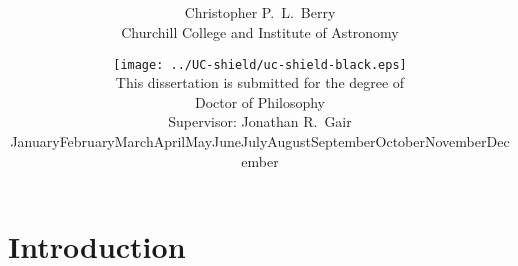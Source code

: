 \documentclass[a4paper, 11pt, titlepage, twoside]{book}
\def\today{\number\day\space\ifcase\month\or January\or February\or March\or April\or May\or June\or July\or August\or September\or October\or November\or December\fi\space\number\year}
\begin{document}
\title{\vspace{0.8cm}
\hrulefill\hspace{0.2cm}\raisebox{-4pt}{\aldineright \aldineleft}\hspace{0.2cm}\hrulefill\\
\\
\vspace{1mm}\hrulefill\hspace{0.2cm}\raisebox{-4pt}{\aldineright \aldineleft}\hspace{0.2cm}\hrulefill}

\author{{\LARGE{}Christopher P.\ L.\ Berry}\vspace{2mm}\\
Churchill College and Institute of Astronomy\\
\vspace{1mm}}

\date{\texttt{[image: ../UC-shield/uc-shield-black.eps]}\vspace{14mm}
\\{This dissertation is submitted for the degree of}\vspace{1mm}\\{\sc\LARGE{}Doctor of Philosophy}\vspace{3mm}
\\{\Large{}Supervisor: Jonathan R.\ Gair}\vspace{11mm}
\\{\Large\today}}

\maketitle
{}





\tableofcontents

\mainmatter

\part{Introduction}
\end{document}
